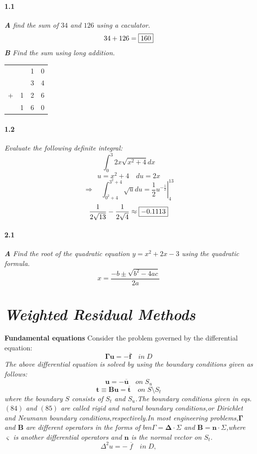 \documentclass{article}
\begin{document}
\paragraph{1.1}
	\textit{
		\textbf{A} find the sum of $34$ and $126$ using a caculator.
	}
	$$ 34 + 126 = \framebox{$160$} $$
	\textit{
		\textbf{B} Find the sum using long addition.
	}
	\begin{center}
		\begin{tabular}{cccc}
			&   & 1 & 0\\
			&   & 3 & 4\\
		+	& 1 & 2 & 6\\
		\hline
			& 1 & 6 & 0 \\
		\end{tabular}
	\end{center}
\paragraph{1.2}
	\textit{
		Evaluate the following definite integral:
		$$
		\int_{0}^{3} 2x \sqrt{x^2+4} dx
		$$
	}
	$$
		u = x^2 + 4
		\quad %
		du = 2x 
	$$
	$$
		\Rightarrow\quad
		\int_{0^2+4}^{3^2+4} \sqrt{u} du 
		= \left. \frac{1}{2} u^{-\frac{1}{2}}
		\right|_{4}^{13}
	$$
	$$
	 \frac{1}{2\sqrt{13}}-
	 \frac{1}{2\sqrt{4}}
	 \approx \framebox{$-0.1113$}
	$$
\paragraph{2.1}
\textit{
	\textbf{A} Find the root of the 
	quadratic equation $y=x^2 +2x -3 $
	using the quadratic formula.
}
$$
	x = \frac{-b\pm\sqrt{b^2-4ac}}{2a}
$$
\section{\textit{Weighted Residual Methods}}
\textbf{Fundamental equations} Consider the problem governed by the differential equation:
$$ \bm{\Gamma u = -\overline{f}}\quad in\;D $$
\textit{The above differential equation is solved by using the boundary conditions given as follows:}
$$
\bm{u=-\overline{u}}\quad on\;S_u
$$
$$
\bm{t\equiv Bu = \overline{t}}\quad on\;S\!\setminus\!S_t
$$
\textit{where the boundary $S$ consists of $S_t$ and $S_u$.\;The boundary conditions given in eqs.$(84)$ and $(85)$ are called rigid and natural boundary conditions,or Dirichlet and Neumann
boundary conditions,respectively.\;In most engineering problems,$\bm{\Gamma}$ and $\bm{B}$ are different operators in the forms of $bm{\Gamma} = \bm{\Delta\cdot\varSigma}$ and $\bm{B}=
\bm{n\cdot\varSigma}$,where $\varsigma$ is another differential operators and $\bm{n}$ is the normal vector on $S_t$.}
$$
\Delta^2 u = -\;\overline{f}\quad in\;D,
$$
\end{document}
